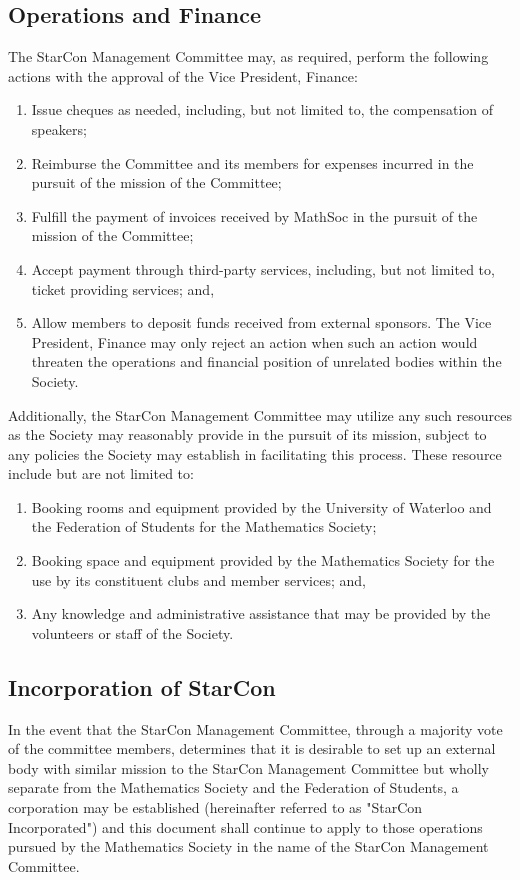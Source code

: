 \subsection{Operations and Finance}
The StarCon Management Committee may, as required, perform the following actions with the approval of the Vice President, Finance:
\begin{enumerate}
\item Issue cheques as needed, including, but not limited to, the compensation of speakers;
\item Reimburse the Committee and its members for expenses incurred in the pursuit of the mission of the Committee;
\item Fulfill the payment of invoices received by MathSoc in the pursuit of the mission of the Committee;
\item Accept payment through third-party services, including, but not limited to, ticket providing services; and,
\item Allow members to deposit funds received from external sponsors.
The Vice President, Finance may only reject an action when such an action would threaten the operations and financial position of unrelated bodies within the Society.
\end{enumerate}

Additionally, the StarCon Management Committee may utilize any such resources as the Society may reasonably provide in the pursuit of its mission, subject to any policies the Society may establish in facilitating this process. These resource include but are not limited to:

\begin{enumerate}
\item Booking rooms and equipment provided by the University of Waterloo and the
Federation of Students for the Mathematics Society;
\item Booking space and equipment provided by the Mathematics Society for the use by its constituent clubs and member services; and,
\item Any knowledge and administrative assistance that may be provided by the volunteers or staff of the Society.
\end{enumerate}

\subsection{Incorporation of StarCon}
In the event that the StarCon Management Committee, through a majority vote of the committee members, determines that it is desirable to set up an external body with similar mission to the StarCon Management Committee but wholly separate from the Mathematics Society and the Federation of Students, a corporation may be established (hereinafter referred to as "StarCon Incorporated") and this document shall continue to apply to those operations pursued by the Mathematics Society in the name of the StarCon Management Committee.

